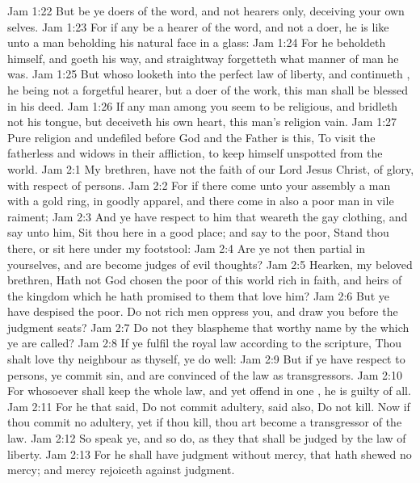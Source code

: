 \vs Jam 1:22 But be ye doers of the word, and not hearers only, deceiving your own selves.
\vs Jam 1:23 For if any be a hearer of the word, and not a doer, he is like unto a man beholding his natural face in a glass:
\vs Jam 1:24 For he beholdeth himself, and goeth his way, and straightway forgetteth what manner of man he was.
\vs Jam 1:25 But whoso looketh into the perfect law of liberty, and continueth , he being not a forgetful hearer, but a doer of the work, this man shall be blessed in his deed.
\vs Jam 1:26 If any man among you seem to be religious, and bridleth not his tongue, but deceiveth his own heart, this man's religion  vain.
\vs Jam 1:27 Pure religion and undefiled before God and the Father is this, To visit the fatherless and widows in their affliction,  to keep himself unspotted from the world.
\vs Jam 2:1 My brethren, have not the faith of our Lord Jesus Christ,  of glory, with respect of persons.
\vs Jam 2:2 For if there come unto your assembly a man with a gold ring, in goodly apparel, and there come in also a poor man in vile raiment;
\vs Jam 2:3 And ye have respect to him that weareth the gay clothing, and say unto him, Sit thou here in a good place; and say to the poor, Stand thou there, or sit here under my footstool:
\vs Jam 2:4 Are ye not then partial in yourselves, and are become judges of evil thoughts?
\vs Jam 2:5 Hearken, my beloved brethren, Hath not God chosen the poor of this world rich in faith, and heirs of the kingdom which he hath promised to them that love him?
\vs Jam 2:6 But ye have despised the poor. Do not rich men oppress you, and draw you before the judgment seats?
\vs Jam 2:7 Do not they blaspheme that worthy name by the which ye are called?
\vs Jam 2:8 If ye fulfil the royal law according to the scripture, Thou shalt love thy neighbour as thyself, ye do well:
\vs Jam 2:9 But if ye have respect to persons, ye commit sin, and are convinced of the law as transgressors.
\vs Jam 2:10 For whosoever shall keep the whole law, and yet offend in one , he is guilty of all.
\vs Jam 2:11 For he that said, Do not commit adultery, said also, Do not kill. Now if thou commit no adultery, yet if thou kill, thou art become a transgressor of the law.
\vs Jam 2:12 So speak ye, and so do, as they that shall be judged by the law of liberty.
\vs Jam 2:13 For he shall have judgment without mercy, that hath shewed no mercy; and mercy rejoiceth against judgment.
